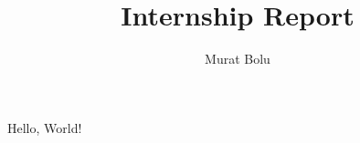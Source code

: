 \documentclass{article}
\title{Internship Report}
\author{Murat Bolu}
\begin{document}
\maketitle
Hello, World!
\lipsum
\end{document}
